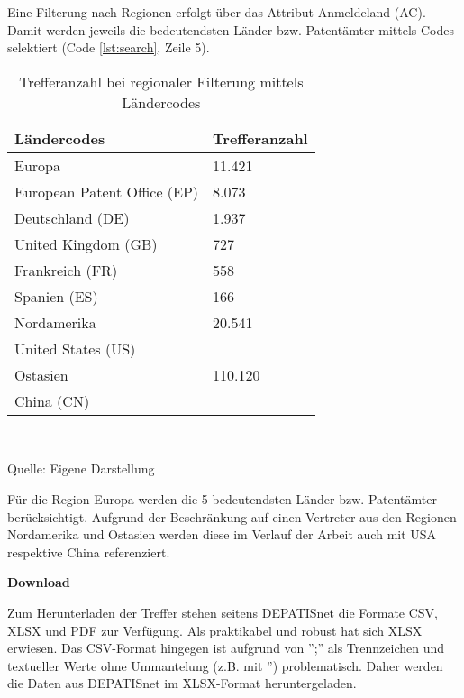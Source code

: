 Eine Filterung nach Regionen erfolgt über das Attribut Anmeldeland (AC). Damit werden jeweils die bedeutendsten Länder bzw. Patentämter mittels Codes selektiert (Code \ref{lst:search}, Zeile 5). 
\renewcommand{\arraystretch}{1.2} %
\begin{table}[H]
	\caption{Trefferanzahl bei regionaler Filterung mittels Ländercodes}
	\label{tbl:depatis_treffer}
	\begin{tabularx}{\textwidth}{X|l}
		\hline
		\textbf{Ländercodes} & \textbf{Trefferanzahl}\\
		\hline
		Europa & 11.421 \\ 
		\hspace{2em}European Patent Office (EP) & \hspace{2em}8.073 \\
		\hspace{2em}Deutschland (DE) & \hspace{2em}1.937 \\
		\hspace{2em}United Kingdom (GB) & \hspace{2em}727 \\
		\hspace{2em}Frankreich (FR) & \hspace{2em}558  \\
		\hspace{2em}Spanien (ES) & \hspace{2em}166 \\
		\hline
		Nordamerika & 20.541 \\ 
		\hspace{2em}United States (US) &  \\
		\hline
		Ostasien & 110.120 \\ 
		\hspace{2em}China (CN) &  \\
		\hline
	\end{tabularx} \\
	\vspace{0.5em}
	\raggedright
	\normalsize{Quelle: Eigene Darstellung}
	\vspace{-1.0em}
\end{table}
Für die Region Europa werden die 5 bedeutendsten Länder bzw. Patentämter berücksichtigt. Aufgrund der Beschränkung auf einen Vertreter aus den Regionen Nordamerika und Ostasien werden diese im Verlauf der Arbeit auch mit USA respektive China referenziert.

\textbf{Download} 

Zum Herunterladen der Treffer stehen seitens DEPATISnet die Formate CSV, XLSX und PDF zur Verfügung. Als praktikabel und robust hat sich XLSX erwiesen. Das CSV-Format hingegen ist aufgrund von '';'' als Trennzeichen und textueller Werte ohne Ummantelung (z.B. mit '') problematisch. Daher werden die Daten aus DEPATISnet im XLSX-Format heruntergeladen.

